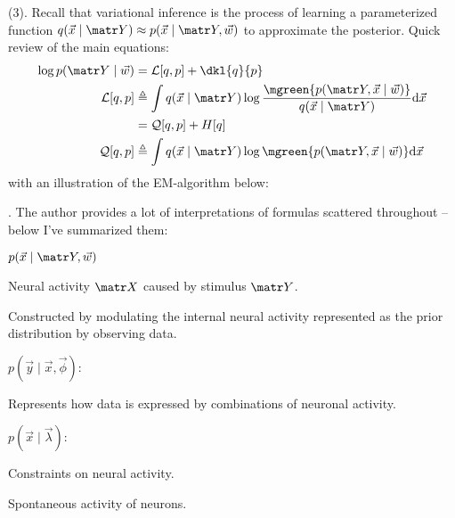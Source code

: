 \documentclass[11pt]{article}
\begin{document}
 (3). Recall that variational inference is the process of learning a parameterized function $q(\vec x \mid \matr Y) \approx p(\vec x \mid \matr Y, \vec w)$ to approximate the posterior.  Quick review of the main equations:
\begin{align}
	\log p(\matr Y \mid \vec w)
		&= \mathcal{L}[q, p] + \dkl{q}{p} \\
	 \mathcal{L}[q, p] 
	 	&\triangleq \int q(\vec x \mid \matr Y) \log \frac{ \mgreen{p(\matr Y , \vec x \mid \vec w)} }{  q(\vec x \mid \matr Y) } \mathrm{d} \vec x \\ 
	 	&= \mathcal{Q}[q, p] + H[q] \\
	 \mathcal{Q}[q, p]
	 	&\triangleq \int q(\vec x \mid \matr Y)  \log \mgreen{p(\matr Y , \vec x \mid \vec w)}  \mathrm{d} \vec x
\end{align}
with an illustration of the EM-algorithm below:



. The author provides a lot of interpretations of formulas scattered throughout -- below I've summarized them:
\begin{compactitem}
	\item {} $p(\vec x \mid \matr Y, \vec w)$
	\begin{compactitem}
		\item Neural activity $\matr X$ caused by stimulus $\matr Y$. 
		\item Constructed by modulating the internal neural activity represented as the prior distribution by observing data.
	\end{compactitem}
	\item {} $p(\vec y \mid \vec x, \vec \phi)$:
	\begin{compactitem}
		\item Represents how data is expressed by combinations of neuronal activity. 
	\end{compactitem}

	\item {} $p(\vec x \mid \vec \lambda)$:
	\begin{compactitem}
		\item Constraints on neural activity. 
		\item Spontaneous activity of neurons. 
	\end{compactitem}
\end{compactitem}
\end{document}
